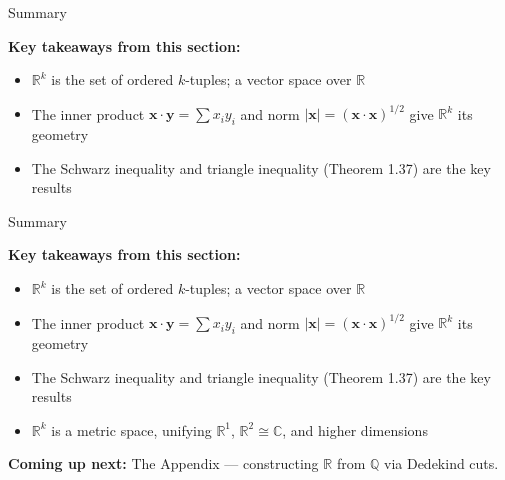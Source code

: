 \documentclass[aspectratio=169,12pt,t]{beamer}
\begin{document}
{%
\begin{frame}{Summary}
  \begin{hlbox}
    \textbf{Key takeaways from this section:}
    \begin{itemize}
      \item $\mathbb{R}^k$ is the set of ordered $k$-tuples; a \alert{vector space} over $\mathbb{R}$
      \item The \alert{inner product} $\mathbf{x}\cdot\mathbf{y} = \sum x_i y_i$
        and \alert{norm} $|\mathbf{x}| = (\mathbf{x}\cdot\mathbf{x})^{1/2}$ give
        $\mathbb{R}^k$ its geometry
      \item The \alert{Schwarz inequality} and \alert{triangle inequality}
        (Theorem 1.37) are the key results
    \end{itemize}
  \end{hlbox}

\end{frame}

\begin{frame}{Summary}
  \begin{hlbox}
    \textbf{Key takeaways from this section:}
    \begin{itemize}
      \item $\mathbb{R}^k$ is the set of ordered $k$-tuples; a \alert{vector space} over $\mathbb{R}$
      \item The \alert{inner product} $\mathbf{x}\cdot\mathbf{y} = \sum x_i y_i$
        and \alert{norm} $|\mathbf{x}| = (\mathbf{x}\cdot\mathbf{x})^{1/2}$ give
        $\mathbb{R}^k$ its geometry
      \item The \alert{Schwarz inequality} and \alert{triangle inequality}
        (Theorem 1.37) are the key results
      \item $\mathbb{R}^k$ is a \alert{metric space}, unifying $\mathbb{R}^1$, $\mathbb{R}^2 \cong \mathbb{C}$,
        and higher dimensions
    \end{itemize}
  \end{hlbox}

  \vspace{0.5em}
  \begin{hlbox}
    \textbf{Coming up next:} The Appendix --- constructing $\mathbb{R}$ from $\mathbb{Q}$ via Dedekind cuts.
  \end{hlbox}


\end{frame}}
\end{document}
